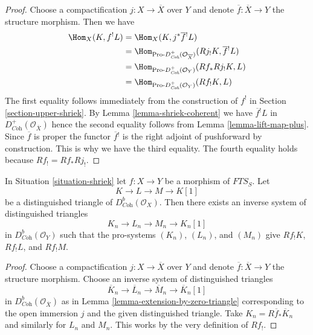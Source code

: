 \begin{proof}
Choose a compactification $j : X \to \overline{X}$ over $Y$ and
denote $\overline{f} : \overline{X} \to Y$ the structure morphism.
Then we have
\begin{align*}
\Hom_X(K, f^!L)
& =
\Hom_X(K, j^*\overline{f}{}^!L) \\
& =
\Hom_{\text{Pro-}D^+_{\textit{Coh}}(\mathcal{O}_{\overline{X}})}
(Rj_!K, \overline{f}{}^!L) \\
& =
\Hom_{\text{Pro-}D^+_{\textit{Coh}}(\mathcal{O}_Y)}(Rf_*Rj_!K, L) \\
& =
\Hom_{\text{Pro-}D^+_{\textit{Coh}}(\mathcal{O}_Y)}(Rf_!K, L)
\end{align*}
The first equality follows immediately from the construction of $f^!$ in
Section \ref{section-upper-shriek}.
By Lemma \ref{lemma-shriek-coherent} we have $\overline{f}{}^!L$
in $D^+_{\textit{Coh}}(\mathcal{O}_{\overline{X}})$ hence the second
equality follows from Lemma \ref{lemma-lift-map-plus}.
Since $\overline{f}$ is proper the functor $\overline{f}{}^!$
is the right adjoint of pushforward by construction. This is
why we have the third equality.
The fourth equality holds because $Rf_! = Rf_* Rj_!$.
\end{proof}

\begin{lemma}
\label{lemma-compactly-supported-triangle}
In Situation \ref{situation-shriek} let $f : X \to Y$ be a morphism of
$\textit{FTS}_S$. Let
$$
K \to L \to M \to K[1]
$$
be a distinguished triangle of $D^b_{\textit{Coh}}(\mathcal{O}_X)$.
Then there exists an inverse system of distinguished triangles
$$
K_n \to L_n \to M_n \to K_n[1]
$$
in $D^b_{\textit{Coh}}(\mathcal{O}_Y)$ such that the pro-systems
$(K_n)$, $(L_n)$, and $(M_n)$ give $Rf_!K$, $Rf_!L$, and $Rf_!M$.
\end{lemma}

\begin{proof}
Choose a compactification $j : X \to \overline{X}$ over $Y$ and
denote $\overline{f} : \overline{X} \to Y$ the structure morphism.
Choose an inverse system of distinguished triangles
$$
\overline{K}_n \to \overline{L}_n \to \overline{M}_n \to \overline{K}_n[1]
$$
in $D^b_{\textit{Coh}}(\mathcal{O}_{\overline{X}})$ as in
Lemma \ref{lemma-extension-by-zero-triangle} corresponding to the
open immersion $j$ and the given distinguished triangle. Take
$K_n = R\overline{f}_*\overline{K}_n$
and similarly for $L_n$ and $M_n$. This works by the very definition
of $Rf_!$.
\end{proof}

